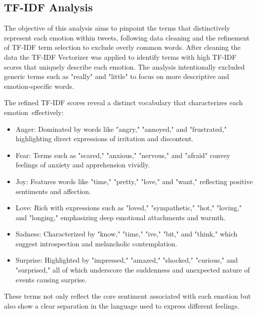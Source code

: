 \subsection{TF-IDF Analysis}

The objective of this analysis aims to pinpoint the terms that distinctively represent each emotion within tweets, following data cleaning and the refinement of TF-IDF term selection to exclude overly common words.
After cleaning the data the TF-IDF Vectorizer was applied to identify terms with high TF-IDF scores that uniquely describe each emotion. The analysis intentionally excluded generic terms such as "really" and "little" to focus on more descriptive and emotion-specific words.

The refined TF-IDF scores reveal a distinct vocabulary that characterizes each emotion~effectively:

\begin{itemize}
  \item Anger: Dominated by words like "angry," "annoyed," and "frustrated," highlighting direct expressions of irritation and discontent.
  \item Fear: Terms such as "scared," "anxious," "nervous," and "afraid" convey feelings of anxiety and apprehension vividly.
  \item Joy: Features words like "time," "pretty," "love," and "want," reflecting positive sentiments and affection.
  \item Love: Rich with expressions such as "loved," "sympathetic," "hot," "loving," and "longing," emphasizing deep emotional attachments and warmth.
  \item Sadness: Characterized by "know," "time," "ive," "bit," and "think," which suggest introspection and melancholic contemplation.
  \item Surprise: Highlighted by "impressed," "amazed," "shocked," "curious," and "surprised," all of which underscore the suddenness and unexpected nature of events causing surprise.
\end{itemize}


These terms not only reflect the core sentiment associated with each emotion but also show a clear separation in the language used to express different feelings. \autocite{tf-idf-analysis}





